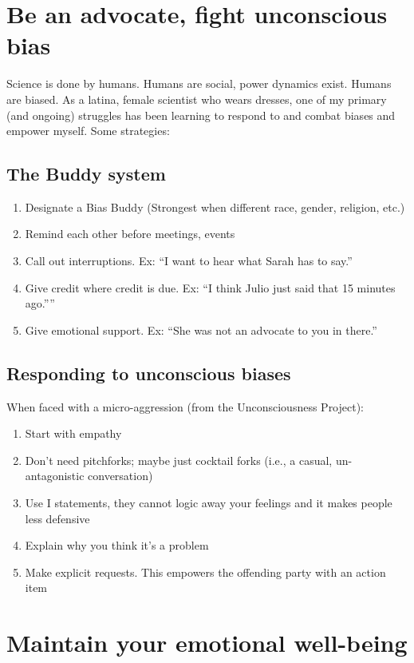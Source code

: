 \documentclass[12pt]{article}
\begin{document}
\section{Be an advocate, fight unconscious bias}
\label{sec:advocate}
Science is done by humans. Humans are social, power dynamics
exist. Humans are biased. As a latina, female scientist who wears
dresses, one of my primary (and ongoing) struggles has been learning
to respond to and combat biases and empower myself. Some strategies:
 
\subsection{The Buddy system}
\label{sec:buddy}
\begin{enumerate}
\item Designate a Bias Buddy (Strongest when different race, gender,
  religion, etc.)
\item Remind each other before meetings, events
\item Call out interruptions. Ex: ``I want to hear what Sarah has to
  say.''
\item Give credit where credit is due. Ex: ``I think Julio just said
  that 15 minutes ago.”''
\item Give emotional support. Ex: ``She was not an advocate to you in
  there.''
\end{enumerate}

\subsection{Responding to unconscious biases}
\label{sec:responding}
When faced with a micro-aggression (from the Unconsciousness Project):
\begin{enumerate}
\item Start with empathy
\item Don't need pitchforks; maybe just cocktail forks (i.e., a
  casual, un-antagonistic conversation)
\item Use I statements, they cannot logic away your feelings and it
  makes people less defensive
\item Explain why you think it's a problem
\item Make explicit requests. This empowers the offending party with
  an action item

\end{enumerate}


\section{Maintain your emotional well-being}
\label{sec:wellBeing}
\end{document}
